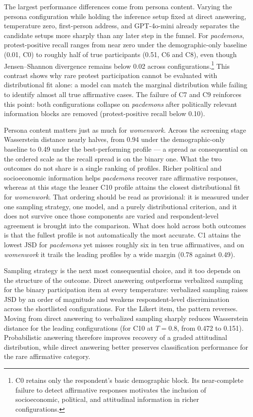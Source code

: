 The largest performance differences come from persona content. Varying the
persona configuration while holding the inference setup fixed at direct
answering, temperature zero, first-person address, and GPT-4o-mini already
separates the candidate setups more sharply than any later step in the
funnel. For
\textit{pacdemons}, protest-positive recall ranges from near zero under the
demographic-only baseline (0.01, C0) to roughly half of true participants
(0.51, C6 and C8), even though Jensen--Shannon divergence remains below
0.02 across configurations.\footnote{C0 retains only the respondent's basic
demographic block. Its near-complete failure to detect affirmative
responses motivates the inclusion of socioeconomic, political, and
attitudinal information in richer configurations.} This contrast shows why
rare protest participation cannot be evaluated with distributional fit
alone: a model can match the marginal distribution while failing to
identify almost all true affirmative cases. The failure of C7 and C9
reinforces this point: both configurations collapse on \textit{pacdemons}
after politically relevant information blocks are removed
(protest-positive recall below 0.10).

Persona content matters just as much for \textit{womenwork}. Across the
screening stage Wasserstein distance nearly halves, from 0.94 under the
demographic-only baseline to 0.49 under the best-performing profile --- a
spread as consequential on the ordered scale as the recall spread is on the
binary one. What the two outcomes do not share is a single ranking of
profiles. Richer political and socioeconomic information helps
\textit{pacdemons} recover rare affirmative responses, whereas at this
stage the leaner C10 profile attains the closest distributional fit for
\textit{womenwork}. That ordering should be read as provisional: it is
measured under one sampling strategy, one model, and a purely
distributional criterion, and it does not survive once those components are
varied and respondent-level agreement is brought into the comparison. What
does hold across both outcomes is that the fullest profile is not
automatically the most accurate. C1 attains the lowest JSD for
\textit{pacdemons} yet misses roughly six in ten true affirmatives, and on
\textit{womenwork} it trails the leading profiles by a wide margin (0.78
against 0.49).

Sampling strategy is the next most consequential choice, and it too depends
on the structure of the outcome. Direct answering outperforms verbalized
sampling for the binary
participation item at every temperature: verbalized sampling raises JSD by
an order of magnitude and weakens respondent-level discrimination across
the shortlisted configurations. For the Likert item, the pattern reverses.
Moving from direct answering to verbalized sampling sharply reduces
Wasserstein distance for the leading configurations (for C10 at $T=0.8$,
from 0.472 to 0.151). Probabilistic answering therefore improves recovery
of a graded attitudinal distribution, while direct answering better
preserves classification performance for the rare affirmative category.

